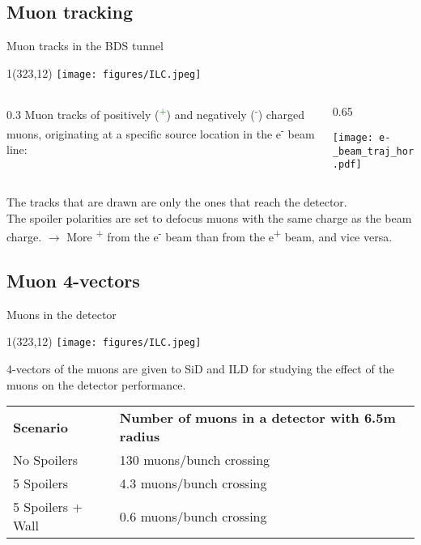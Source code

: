 \documentclass[xcolor={dvipsnames}]{beamer}
\newcommand{\ilclogo}{
  \setlength{\TPHorizModule}{1pt}
  \setlength{\TPVertModule}{1pt}
  \begin{textblock}{1}(323,12)
   \texttt{[image: figures/ILC.jpeg]}
  \end{textblock}
}
\begin{document}
\subsection{Muon tracking}
\begin{frame}{Muon tracks in the BDS tunnel}
\ilclogo

\begin{columns}
 \begin{column}{0.3\textwidth}
  Muon tracks of positively (\textcolor{green}{\textmu\textsuperscript{+}}) and negatively (\textcolor{red}{\textmu\textsuperscript{-}}) charged muons, originating at a specific source location in the e\textsuperscript{-} beam line:
 \end{column}
 \begin{column}{0.65\textwidth}
  \begin{center}
\texttt{[image: e-\_beam\_traj\_hor.pdf]}
\end{center}
 \end{column}
\end{columns}

\small The tracks that are drawn are only the ones that reach the detector.\\
\small The spoiler polarities are set to defocus muons with the same charge as the beam charge. $\rightarrow$ More \textmu\textsuperscript{+} from the e\textsuperscript{-} beam than from the e\textsuperscript{+} beam, and vice versa.
\end{frame}

\subsection{Muon 4-vectors}
\begin{frame}{Muons in the detector}
\ilclogo
4-vectors of the muons are given to SiD and ILD for studying the effect of the muons on the detector performance.\\
\vspace*{0.2cm}
\begin{tabular}{ll}
\textbf{Scenario} & \textbf{Number of muons in a detector with 6.5m radius}\\
 No Spoilers & 130 muons/bunch crossing\\
 5 Spoilers& 4.3 muons/bunch crossing\\
 5 Spoilers + Wall & 0.6 muons/bunch crossing
\end{tabular}
\end{frame}
\end{document}

